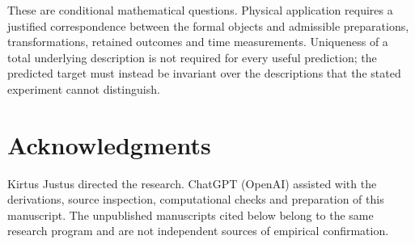 \documentclass[11pt,letterpaper]{article}
\begin{document}
These are conditional mathematical questions. Physical application requires
a justified correspondence between the formal objects and admissible
preparations, transformations, retained outcomes and time measurements.
Uniqueness of a total underlying description is not required for every
useful prediction; the predicted target must instead be invariant over
the descriptions that the stated experiment cannot distinguish.



\section*{Acknowledgments}
Kirtus Justus directed the research. ChatGPT (OpenAI) assisted with the
derivations, source inspection, computational checks and preparation of this
manuscript. The unpublished manuscripts cited below belong to the same research
program and are not independent sources of empirical confirmation.
\end{document}
